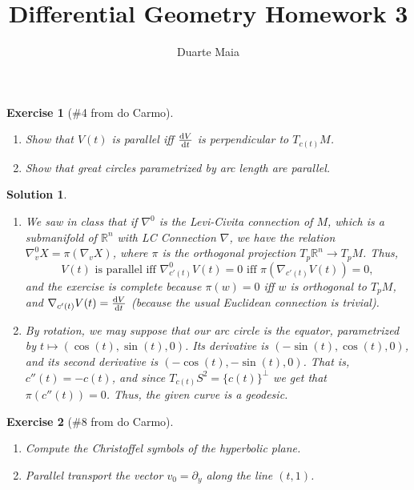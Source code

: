 \documentclass{article}
\title{Differential Geometry Homework 3}
\author{Duarte Maia}
\theoremstyle{plain}
\newtheorem*{ex}{Exercise}
\theoremstyle{nonumberplain}
\newtheorem{sol}{Solution}
\newcommand{\R}{\mathbb{R}}
\begin{document}
\maketitle

\begin{ex}[\#4 from do Carmo]
\leavevmode
\begin{enumerate}
\item Show that $V(t)$ is parallel iff $\diff V t$ is perpendicular to $T_{c(t)}M$.
\item Show that great circles parametrized by arc length are parallel.
\end{enumerate}
\end{ex}

\begin{sol}
\leavevmode
\begin{enumerate}
\item We saw in class that if $\nabla^0$ is the Levi-Civita connection of $M$, which is a submanifold of $\R^n$ with LC Connection $\nabla$, we have the relation $\nabla^0_v X = \pi(\nabla_v X)$, where $\pi$ is the orthogonal projection $T_p \R^n \to T_p M$. Thus,
\begin{equation}
V(t) \text{ is parallel iff } \nabla^0_{c'(t)} V(t) = 0 \text{ iff } \pi(\nabla_{c'(t)} V(t)) = 0,
\end{equation}
and the exercise is complete because $\pi(w) = 0$ iff $w$ is orthogonal to $T_p M$, and $\nabla_{c'(t)} V(t) = \diff V t$ (because the usual Euclidean connection is trivial).
\item By rotation, we may suppose that our arc circle is the equator, parametrized by $t \mapsto (\cos(t), \sin(t), 0)$. Its derivative is $(-\sin(t), \cos(t), 0)$, and its second derivative is $(-\cos(t), -\sin(t), 0)$. That is, $c''(t) = -c(t)$, and since $T_{c(t)} S^2 = \{c(t)\}^\perp$ we get that $\pi(c''(t)) = 0$. Thus, the given curve is a geodesic.
\end{enumerate}
\end{sol}

\begin{ex}[\#8 from do Carmo]
\leavevmode
\begin{enumerate}
\item Compute the Christoffel symbols of the hyperbolic plane.
\item Parallel transport the vector $v_0 = \partial_y$ along the line $(t,1)$.
\end{enumerate}
\end{ex}
\end{document}
